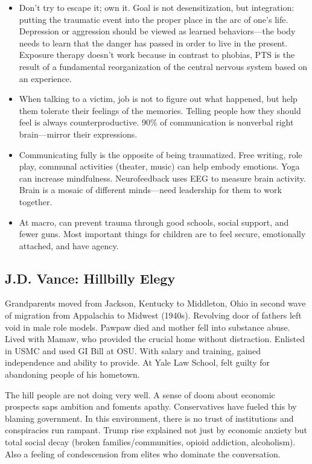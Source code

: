 \documentclass[
]{article}
\begin{document}
\begin{itemize}
\item
  Don't try to escape it; own it. Goal is not desensitization, but
  integration: putting the traumatic event into the proper place in the
  arc of one's life. Depression or aggression should be viewed as
  learned behaviors---the body needs to learn that the danger has passed
  in order to live in the present. Exposure therapy doesn't work because
  in contrast to phobias, PTS is the result of a fundamental
  reorganization of the central nervous system based on an experience.
\item
  When talking to a victim, job is not to figure out what happened, but
  help them tolerate their feelings of the memories. Telling people how
  they should feel is always counterproductive. 90\% of communication is
  nonverbal right brain---mirror their expressions.
\item
  Communicating fully is the opposite of being traumatized. Free
  writing, role play, communal activities (theater, music) can help
  embody emotions. Yoga can increase mindfulness. Neurofeedback uses EEG
  to measure brain activity. Brain is a mosaic of different minds---need
  leadership for them to work together.
\item
  At macro, can prevent trauma through good schools, social support, and
  fewer guns. Most important things for children are to feel secure,
  emotionally attached, and have agency.
\end{itemize}

\hypertarget{j.d.-vance-hillbilly-elegy}{%
\subsection{J.D. Vance: Hillbilly
Elegy}\label{j.d.-vance-hillbilly-elegy}}

Grandparents moved from Jackson, Kentucky to Middleton, Ohio in second
wave of migration from Appalachia to Midwest (1940s). Revolving door of
fathers left void in male role models. Pawpaw died and mother fell into
substance abuse. Lived with Mamaw, who provided the crucial home without
distraction. Enlisted in USMC and used GI Bill at OSU. With salary and
training, gained independence and ability to provide. At Yale Law
School, felt guilty for abandoning people of his hometown.

The hill people are not doing very well. A sense of doom about economic
prospects saps ambition and foments apathy. Conservatives have fueled
this by blaming government. In this environment, there is no trust of
institutions and conspiracies run rampant. Trump rise explained not just
by economic anxiety but total social decay (broken families/communities,
opioid addiction, alcoholism). Also a feeling of condescension from
elites who dominate the conversation.
\end{document}

